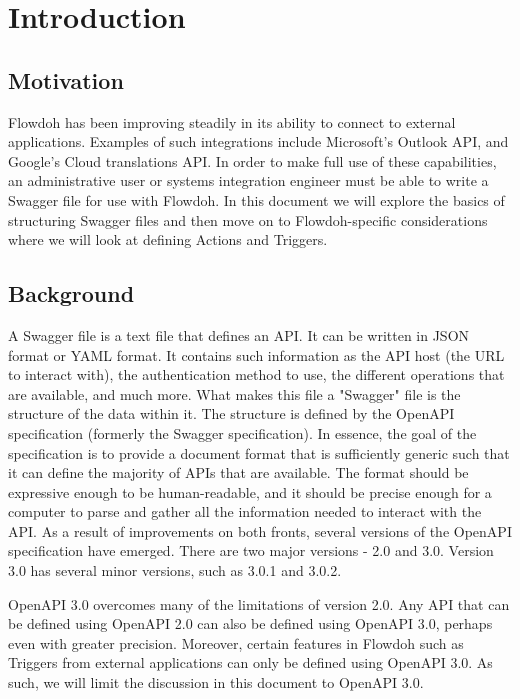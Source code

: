 \section{Introduction}
\subsection{Motivation}
Flowdoh has been improving steadily in its ability to connect to external applications. Examples of such integrations include Microsoft's Outlook API, and Google's Cloud translations API. In order to make full use of these capabilities, an administrative user or systems integration engineer must be able to write a Swagger file for use with Flowdoh. In this document we will explore the basics of structuring Swagger files and then move on to Flowdoh-specific considerations where we will look at defining Actions and Triggers.

\subsection{Background}
A Swagger file is a text file that defines an API. It can be written in JSON format or YAML format. It contains such information as the API host (the URL to interact with), the authentication method to use, the different operations that are available, and much more. What makes this file a "Swagger" file is the structure of the data within it. The structure is defined by the OpenAPI specification (formerly the Swagger specification). In essence, the goal of the specification is to provide a document format that is sufficiently generic such that it can define the majority of APIs that are available. The format should be expressive enough to be human-readable, and it should be precise enough for a computer to parse and gather all the information needed to interact with the API. As a result of improvements on both fronts, several versions of the OpenAPI specification have emerged. There are two major versions - 2.0 and 3.0. Version 3.0 has several minor versions, such as 3.0.1 and 3.0.2.

OpenAPI 3.0 overcomes many of the limitations of version 2.0. Any API that can be defined using OpenAPI 2.0 can also be defined using OpenAPI 3.0, perhaps even with greater precision. Moreover, certain features in Flowdoh such as Triggers from external applications can only be defined using OpenAPI 3.0. As such, we will limit the discussion in this document to OpenAPI 3.0.